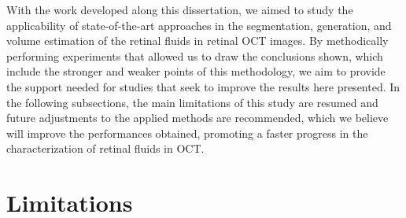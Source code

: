 With the work developed along this dissertation, we aimed to study the applicability of state-of-the-art approaches in the segmentation, generation, and volume estimation of the retinal fluids in retinal OCT images. By methodically performing experiments that allowed us to draw the conclusions shown, which include the stronger and weaker points of this methodology, we aim to provide the support needed for studies that seek to improve the results here presented. In the following subsections, the main limitations of this study are resumed and future adjustments to the applied methods are recommended, which we believe will improve the performances obtained, promoting a faster progress in the characterization of retinal fluids in OCT.

\section{Limitations}

